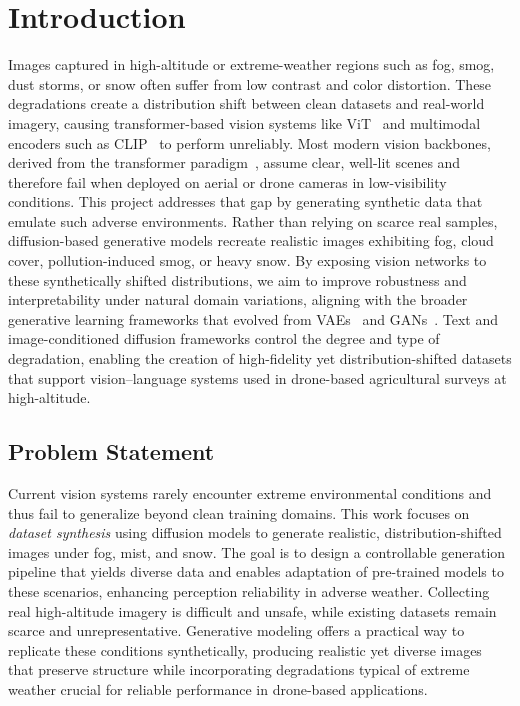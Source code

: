 

\chapter{Introduction}

Images captured in high-altitude or extreme-weather regions such as fog, smog, dust storms, or snow often suffer from low contrast and color distortion.  
These degradations create a distribution shift between clean datasets and real-world imagery, causing transformer-based vision systems like ViT~\cite{dosovitskiy2020vit} and multimodal encoders such as CLIP~\cite{radford2021clip} to perform unreliably.  
Most modern vision backbones, derived from the transformer paradigm~\cite{vaswani2017attention}, assume clear, well-lit scenes and therefore fail when deployed on aerial or drone cameras in low-visibility conditions.
This project addresses that gap by generating synthetic data that emulate such adverse environments.  
Rather than relying on scarce real samples, diffusion-based generative models recreate realistic images exhibiting fog, cloud cover, pollution-induced smog, or heavy snow.  
By exposing vision networks to these synthetically shifted distributions, we aim to improve robustness and interpretability under natural domain variations, aligning with the broader generative learning frameworks that evolved from VAEs~\cite{kingma2013autoencoding} and GANs~\cite{goodfellow2014gan}.
Text and image-conditioned diffusion frameworks control the degree and type of degradation, enabling the creation of high-fidelity yet distribution-shifted datasets that support vision–language systems used in drone-based agricultural surveys at high-altitude.

\section{Problem Statement}


Current vision systems rarely encounter extreme environmental conditions and thus fail to generalize beyond clean training domains.
This work focuses on \emph{dataset synthesis} using diffusion models to generate realistic, distribution-shifted images under fog, mist, and snow.
The goal is to design a controllable generation pipeline that yields diverse data and enables adaptation of pre-trained models to these scenarios, enhancing perception reliability in adverse weather.
Collecting real high-altitude imagery is difficult and unsafe, while existing datasets remain scarce and unrepresentative.
Generative modeling offers a practical way to replicate these conditions synthetically, producing realistic yet diverse images that preserve structure while incorporating degradations typical of extreme weather crucial for reliable performance in drone-based applications.

